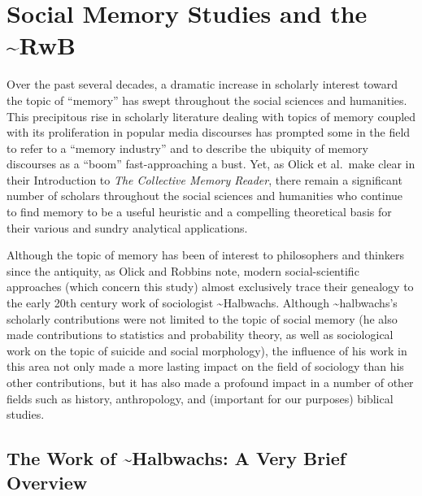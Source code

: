 \hypertarget{social-memory-studies-and-the-rwb}{%
\chapter{Social Memory Studies and the
\textasciitilde{}RwB}\label{social-memory-studies-and-the-rwb}}

Over the past several decades, a dramatic increase in scholarly interest
toward the topic of ``memory'' has swept throughout the social sciences
and humanities. This precipitous rise in scholarly literature dealing
with topics of memory coupled with its proliferation in popular media
discourses has prompted some in the field to refer to a ``memory
industry'' and to describe the ubiquity of memory discourses as a
``boom'' fast-approaching a
bust.\autocites{rosenfeld_jmh2009}{winter2006}{berliner_aq2005}{confino_ahr1997}
Yet, as Olick et al.~make clear in their Introduction to \emph{The
Collective Memory Reader}, there remain a significant number of scholars
throughout the social sciences and humanities who continue to find
memory to be a useful heuristic and a compelling theoretical basis for
their various and sundry analytical
applications.\autocite[3--6]{olick_olick-etal2011}

Although the topic of memory has been of interest to philosophers and
thinkers since the antiquity,\autocite{carruthers_radstone-schwarz2011}
as Olick and Robbins note, modern social-scientific approaches (which
concern this study) almost exclusively trace their genealogy to the
early 20th century work of sociologist
\textasciitilde{}Halbwachs.\autocites[106]{olick-robbins_ars1998}[It
should be noted, however, that \textasciitilde{}halbwachs was not the
first or only person to do work on memory or the impact of social
structures on memory. See][8--36]{olick_olick-etal2011} Although
\textasciitilde{}halbwachs's scholarly contributions were not limited to
the topic of social memory (he also made contributions to statistics and
probability theory, as well as sociological work on the topic of suicide
and social morphology), the influence of his work in this area not only
made a more lasting impact on the field of sociology than his other
contributions, but it has also made a profound impact in a number of
other fields such as history, anthropology, and (important for our
purposes) biblical studies.\autocite[13--20]{coser_halbwachs1992}

\hypertarget{the-work-of-halbwachs-a-very-brief-overview}{%
\section{The Work of \textasciitilde{}Halbwachs: A Very Brief
Overview}\label{the-work-of-halbwachs-a-very-brief-overview}}

